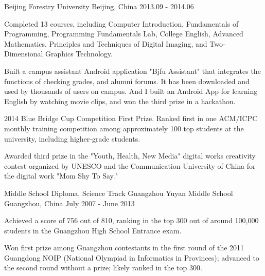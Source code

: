 \begin{cventries}
    {Beijing Forestry University} %
    {Beijing, China} %
    {2013.09 - 2014.06} %
    {
      \begin{cvitems} %
        \item {Completed 13 courses, including Computer Introduction, Fundamentals of Programming, Programming Fundamentals Lab, College English, Advanced Mathematics, Principles and Techniques of Digital Imaging, and Two-Dimensional Graphics Technology.}
        \item {Built a campus assistant Android application "Bjfu Assistant" that integrates the functions of checking grades, and alumni forums. It has been downloaded and used by thousands of users on campus. And I built an Android App for learning English by watching movie clips, and won the third prize in a hackathon.}
        \item {2014 Blue Bridge Cup Competition First Prize. Ranked first in one ACM/ICPC monthly training competition among approximately 100 top students at the university, including higher-grade students.}
        \item {Awarded third prize in the "Youth, Health, New Media" digital works creativity contest organized by UNESCO and the Communication University of China for the digital work "Mom Shy To Say."}
      \end{cvitems}
    }

  \cventry
    {Middle School Diploma, Science Track} %
    {Guangzhou Yuyan Middle School} %
    {Guangzhou, China} %
    {July 2007 - June 2013} %
    {
      \begin{cvitems} %
        \item {Achieved a score of 756 out of 810, ranking in the top 300 out of around 100,000 students in the Guangzhou High School Entrance exam.}
        \item {Won first prize among Guangzhou contestants in the first round of the 2011 Guangdong NOIP (National Olympiad in Informatics in Provinces); advanced to the second round without a prize; likely ranked in the top 300.}
      \end{cvitems}
    }

\end{cventries}
